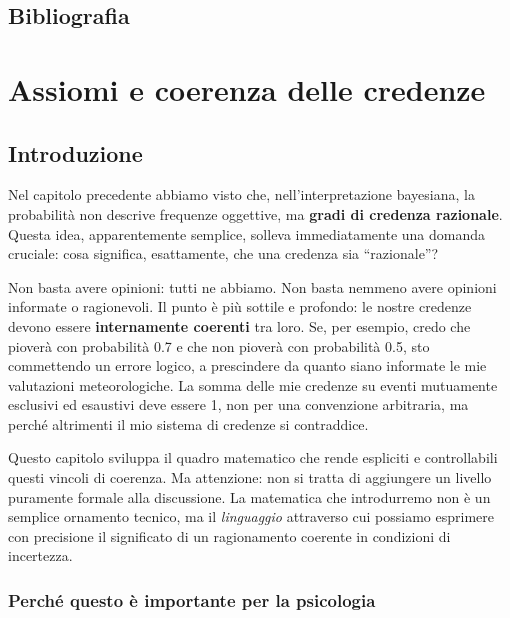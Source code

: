 \documentclass[
  italian,
  letterpaper,
  a4paper,
  11pt,
  open=any]{scrbook}
\theoremstyle{plain}
\theoremstyle{definition}
\theoremstyle{definition}
\theoremstyle{remark}
\begin{document}
\section*{Bibliografia}\label{bibliografia}


\chapter{Assiomi e coerenza delle
credenze}\label{sec-prob-axioms-coherence}

\section*{Introduzione}\label{introduzione-1}


Nel capitolo precedente abbiamo visto che, nell'interpretazione
bayesiana, la probabilità non descrive frequenze oggettive, ma
\textbf{gradi di credenza razionale}. Questa idea, apparentemente
semplice, solleva immediatamente una domanda cruciale: cosa significa,
esattamente, che una credenza sia ``razionale''?

Non basta avere opinioni: tutti ne abbiamo. Non basta nemmeno avere
opinioni informate o ragionevoli. Il punto è più sottile e profondo: le
nostre credenze devono essere \textbf{internamente coerenti} tra loro.
Se, per esempio, credo che pioverà con probabilità 0.7 e che non pioverà
con probabilità 0.5, sto commettendo un errore logico, a prescindere da
quanto siano informate le mie valutazioni meteorologiche. La somma delle
mie credenze su eventi mutuamente esclusivi ed esaustivi deve essere 1,
non per una convenzione arbitraria, ma perché altrimenti il mio sistema
di credenze si contraddice.

Questo capitolo sviluppa il quadro matematico che rende espliciti e
controllabili questi vincoli di coerenza. Ma attenzione: non si tratta
di aggiungere un livello puramente formale alla discussione. La
matematica che introdurremo non è un semplice ornamento tecnico, ma il
\emph{linguaggio} attraverso cui possiamo esprimere con precisione il
significato di un ragionamento coerente in condizioni di incertezza.

\subsection*{Perché questo è importante per la
psicologia}\label{perchuxe9-questo-uxe8-importante-per-la-psicologia}
\end{document}

